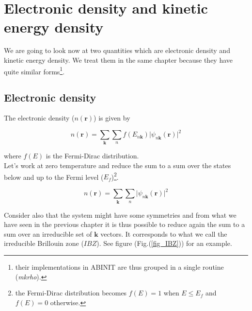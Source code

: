 \documentclass[a4paper,12pt]{report}
\begin{document}
\chapter{Electronic density and kinetic energy density}
\label{chapter2}

We are going to look now at two quantities which are electronic density and kinetic energy density. We treat them in the same chapter because they have quite similar forms\footnote{their implementations in ABINIT are thus grouped in a single routine (\textit{mkrho}).}.

\section{Electronic density}
\label{section2_1}

The electronic density ($n(\mathbf{r})$) is given by

\begin{equation}
n(\mathbf{r}) = \sum_{\mathbf{k}} \sum_n f(E_{n\mathbf{k}}) \vert \psi_{n\mathbf{k}}(\mathbf{r}) \vert^2
\end{equation}

where $f(E)$ is the Fermi-Dirac distribution.\\
Let's work at zero temperature and reduce the sum to a sum over the states below and up to the Fermi level ($E_f$)\footnote{the Fermi-Dirac distribution becomes $f(E)=1$ when $E\leq E_f$ and $f(E)=0$ otherwise.}.

\begin{equation}
n(\mathbf{r}) = \sum_{\mathbf{k}} \sum_n \vert \psi_{n\mathbf{k}}(\mathbf{r}) \vert^2
\end{equation}

Consider also that the system might have some symmetries and from what we have seen in the previous chapter it is thus possible to reduce again the sum to a sum over an irreducible set of $\mathbf{k}$ vectors. It corresponds to what we call the irreducible Brillouin zone ($IBZ$). See figure (Fig.(\ref{fig_IBZ})) for an example.\\
\end{document}
